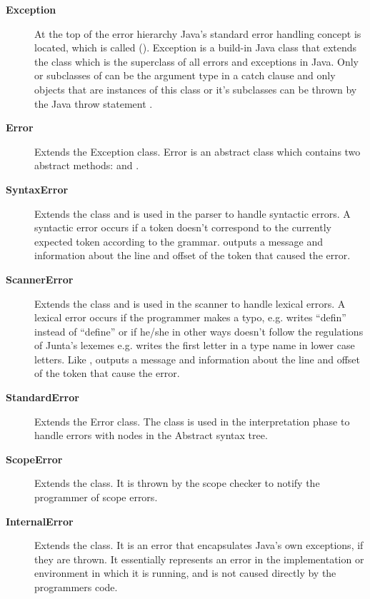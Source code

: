 \begin{description}
\item[\textbf{Exception}] At the top of the error hierarchy Java's standard
  error handling concept is located, which is called 
  (). Exception is a build-in Java class that extends the
   class which is the superclass of all errors and exceptions in Java.
  Only  or subclasses of  can be the argument type in a catch
  clause and only objects that are instances of this class or it's subclasses
  can be thrown by the Java throw statement \cite{throwable}.

\item[\textbf{Error}] Extends the Exception class. Error is an abstract class
  which contains two abstract methods:  and
  .

\item[\textbf{SyntaxError}] Extends the  class and is used in the parser to
  handle syntactic errors. A syntactic error occurs if a token doesn't
  correspond to the currently expected token according to the grammar.
   outputs a message and information about the line and offset of the
  token that caused the error. 

\item[\textbf{ScannerError}] Extends the  class and is used in the
  scanner to handle lexical errors. A lexical error occurs if the programmer
  makes a typo, e.g. writes ``defin'' instead of ``define'' or if he/she in
  other ways doesn't follow the regulations of Junta's lexemes e.g. writes the
  first letter in a type name in lower case letters. Like ,
   outputs a message and information about the line and offset of
  the token that cause the error.  

\item[\textbf{StandardError}] Extends the Error class. The
   class
  is used in the interpretation phase to handle errors with nodes in the
  Abstract syntax tree.  

\item[\textbf{ScopeError}] Extends the  class. It is
  thrown by the scope checker to notify the programmer of scope errors.

\item[\textbf{InternalError}] Extends the  class. It is
  an error that encapsulates Java's own exceptions, if they are thrown. It
  essentially represents an error in the implementation or environment in which
  it is running, and is not caused directly by the programmers code.


\end{description}
